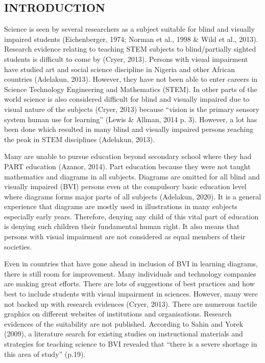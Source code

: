\documentclass[11.5pt]{sig-alternate} %
\begin{document}
\begin{large}
\section*{INTRODUCTION}

Science is seen by several researchers as a subject suitable for blind and visually impaired students (Eichenberger, 1974; Norman et al., 1998 \& Wild et al., 2013). Research evidence relating to teaching STEM subjects to blind/partially sighted students is difficult to come by (Cryer, 2013). Persons with visual impairment have studied art and social science discipline in Nigeria and other African countries (Adelakun, 2013). However, they have not been able to enter careers in Science Technology Engineering and Mathematics (STEM). In other parts of the world science is also considered difficult for blind and visually impaired due to visual nature of the subjects (Cryer, 2013) because “vision is the primary sensory system human use for learning” (Lewis \& Allman, 2014 p. 3). However, a lot has been done which resulted in many blind and visually impaired persons reaching the peak in STEM disciplines (Adelakun, 2013). 

Many are unable to pursue education beyond secondary school where they had PART education (Azanor, 2014). Part education because they were not taught mathematics and diagrams in all subjects. Diagrams are omitted for all blind and visually impaired (BVI) persons even at the compulsory basic education level where diagrams forms major parts of all subjects (Adelakun, 2020). It is a general experience that diagrams are mostly used in illustrations in many subjects especially early years. Therefore, denying any child of this vital part of education is denying such children their fundamental human right. It also means that persons with visual impairment are not considered as equal members of their societies. 

Even in countries that have gone ahead in inclusion of BVI in learning diagrams, there is still room for improvement. Many individuals and technology companies are making great efforts. There are lots of suggestions of best practices and how best to include students with visual impairment in sciences. However, many were not backed up with research evidences (Cryer, 2013). There are numerous tactile graphics on different websites of institutions and organisations. Research evidences of the suitability are not published. According to Sahin and Yorek (2009), a literature search for existing studies on instructional materials and strategies for teaching science to BVI revealed that “there is a severe shortage in this area of study” (p.19).


\end{large}
\end{document}
